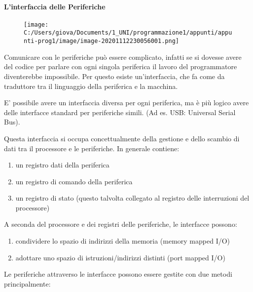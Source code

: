 \documentclass[
]{article}
\begin{document}
\hypertarget{header-n259}{%
\paragraph{L'interfaccia delle Periferiche}\label{header-n259}}

\begin{figure}
\centering
\texttt{[image: C:/Users/giova/Documents/1\_UNI/programmazione1/appunti/appunti-prog1/image/image-20201112230056001.png]}
\caption{}
\end{figure}

Comunicare con le periferiche può essere complicato, infatti se si
dovesse avere del codice per parlare con ogni singola periferica il
lavoro del programmatore diventerebbe impossibile. Per questo esiste
un'interfaccia, che fa come da traduttore tra il linguaggio della
periferica e la macchina.

E' possibile avere un interfaccia diversa per ogni periferica, ma è più
logico avere delle interfacce standard per periferiche simili. (Ad es.
USB: Universal Serial Bus).

Questa interfaccia si occupa concettualmente della gestione e dello
scambio di dati tra il processore e le periferiche. In generale
contiene:

\begin{enumerate}
\def\labelenumi{\arabic{enumi}.}
\item
  un registro dati della periferica
\item
  un registro di comando della periferica
\item
  un registro di stato (questo talvolta collegato al registro delle
  interruzioni del processore)
\end{enumerate}

A seconda del processore e dei registri delle periferiche, le interfacce
possono:

\begin{enumerate}
\def\labelenumi{\arabic{enumi}.}
\item
  condividere lo spazio di indirizzi della memoria (memory mapped I/O)
\item
  adottare uno spazio di istruzioni/indirizzi distinti (port mapped I/O)
\end{enumerate}

Le periferiche attraverso le interfacce possono essere gestite con due
metodi principalmente:
\end{document}
